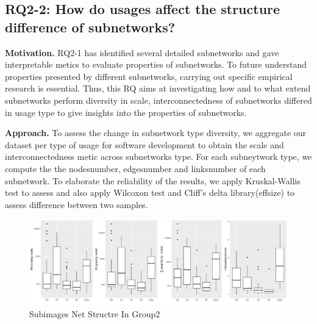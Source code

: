 \documentclass[sigconf]{acmart}
\begin{document}
\subsection{RQ2-2:  How do usages affect the structure difference of subnetworks?}\label{AA}
\noindent\textbf{Motivation. } RQ2-1 has identified several detailed subnetworks and gave interpretable metics to evaluate properties of subnetworks. To future understand properties presented by different subnetworks,  carrying out specific empirical research is essential. Thus, this RQ aims at investigating how and to what extend subnetworks perform diversity in scale, interconnectedness of subnetworks differed in usage type to give insights into the properties of subnetworks. 






\noindent\textbf{Approach. }
To assess the change in subnetwork type diversity, we aggregate our dataset per type of usage for software development to obtain the scale and interconnectedness metic across subnetworks type. For each subneytwork type, we compute the the nodesnumber, edgesnumber and linksnumber of each subnetwork. 
To elaborate the reliability of the results, we apply Kruskal-Wallis test to assess and also apply Wilcoxon test and Cliff’s delta library(effsize) to assess difference between two samples. 





\begin{figure}[htbp]
\centerline{\includegraphics[width=1\textwidth]{picture//sub_coreimages_netstructre.pdf}}
\caption{Subimages Net Structre In Group2}
\label{fig}
\end{figure}
\end{document}
